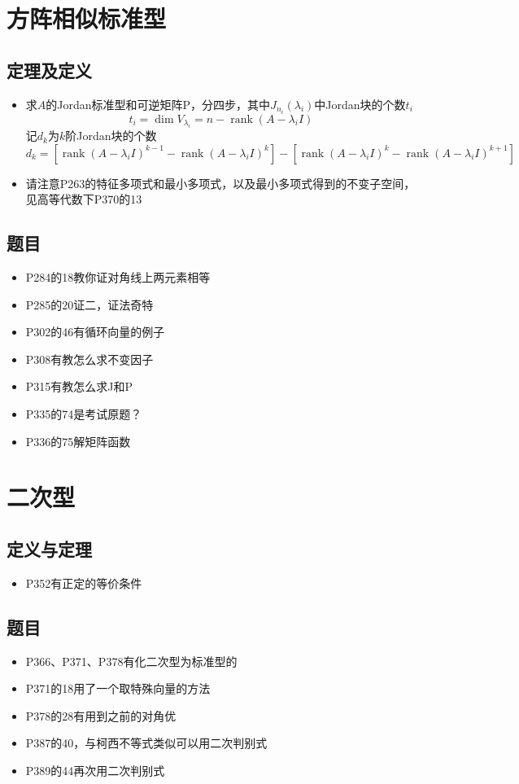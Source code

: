 \documentclass[UTF8]{ctexart}
\DeclareMathOperator{\rank}{rank}
\begin{document}
\section{方阵相似标准型}
\subsection{定理及定义}
\begin{itemize}
\item 求$A$的Jordan标准型和可逆矩阵P，分四步，其中$J_{n_i}(\lambda_i)$中Jordan块的个数$t_i$
\[
t_i=\dim V_{\lambda_i} = n - \rank(A-\lambda_iI)
\]
记$d_k$为$k$阶Jordan块的个数
\[
d_k = [\rank(A-\lambda_iI)^{k-1}-\rank(A-\lambda_iI)^{k}] - [\rank(A-\lambda_iI)^{k}-\rank(A-\lambda_iI)^{k+1}]
\]

\item 请注意P263的特征多项式和最小多项式，以及最小多项式得到的不变子空间，见高等代数下P370的13
\end{itemize}
\subsection{题目}
\begin{itemize}
\item P284的18教你证对角线上两元素相等
\item P285的20证二，证法奇特
\item P302的46有循环向量的例子
\item P308有教怎么求不变因子
\item P315有教怎么求J和P
\item P335的74是考试原题？
\item P336的75解矩阵函数
\end{itemize}

\section{二次型}
\subsection{定义与定理}
\begin{itemize}
\item P352有正定的等价条件
\end{itemize}

\subsection{题目}
\begin{itemize}
\item P366、P371、P378有化二次型为标准型的
\item P371的18用了一个取特殊向量的方法
\item P378的28有用到之前的对角优
\item P387的40，与柯西不等式类似可以用二次判别式
\item P389的44再次用二次判别式
\end{itemize}
\end{document}
